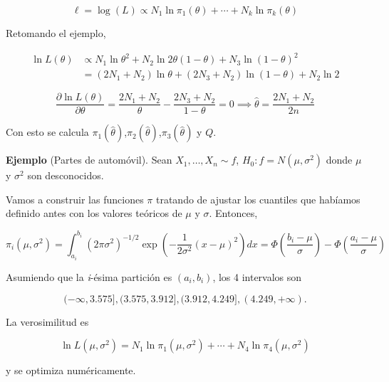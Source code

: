 \documentclass[
  12pt,
]{book}
\begin{document}
\[\ell = \log (L) \propto N_1\ln\pi_1(\theta)+\cdots+N_k\ln\pi_k(\theta)\]

Retomando el ejemplo,

\begin{align*}
\ln L(\theta) & \propto N_1\ln \theta^2 + N_2 \ln 2\theta(1-\theta) + N_3\ln (1-\theta)^2\\
& = (2N_1+N_2)\ln \theta + (2N_3+N_2)\ln(1-\theta) + N_2\ln 2
\end{align*}

\[\dfrac{\partial \ln L(\theta)}{\partial\theta} = \dfrac{2N_1+N_2}{\theta}-\dfrac{2N_3+N_2}{1-\theta} = 0 \implies \hat\theta = \dfrac{2N_1+N_2}{2n}\]

Con esto se calcula \(\pi_1(\hat \theta)\),\(\pi_2(\hat \theta)\),\(\pi_3(\hat \theta)\) y \(Q\).

\textbf{Ejemplo} (Partes de automóvil). Sean \(X_1,\dots,X_n\sim f\), \(H_0: f = N(\mu,\sigma^2)\) donde \(\mu\) y \(\sigma^2\) son desconocidos.

Vamos a construir las funciones \(\pi\) tratando de ajustar los cuantiles que
habíamos definido antes con los valores teóricos de \(\mu\) y \(\sigma\). Entonces,

\[\pi_i(\mu,\sigma^2) = \int_{a_i}^{b_i}(2\pi\sigma^2)^{-1/2}\exp\left(-\dfrac 1{2\sigma^2}(x-\mu)^2\right)dx = \Phi\left(\dfrac{b_i-\mu}{\sigma}\right)-\Phi\left(\dfrac{a_i-\mu}{\sigma}\right)\]

Asumiendo que la \emph{i}-ésima partición es \((a_i,b_i)\), los 4 intervalos son

\[(-\infty,3.575],(3.575,3.912],(3.912,4.249], (4.249,+\infty).\]

La verosimilitud es

\[\ln L(\mu,\sigma^2) = N_1\ln \pi_1(\mu,\sigma^2)+\cdots+N_4\ln\pi_4(\mu,\sigma^2)\]

y se optimiza numéricamente.
\end{document}
